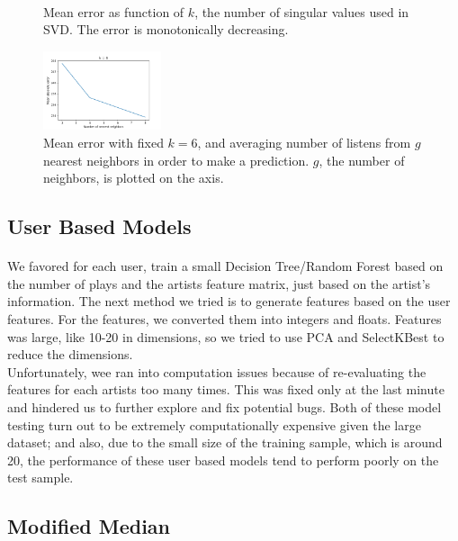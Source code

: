 \documentclass[11pt]{article}
\begin{document}
\begin{figure}[]
\begin{subfigure}[!t]{0.31\textwidth}
    \end{subfigure}\\
        \caption{Mean error as function of $k$, the number of singular values used in SVD. The error is monotonically decreasing.}
            \label{SVD_k}
\end{figure}


\begin{figure}[] 
\centering
        \includegraphics[width=0.31\textwidth]{Plots/SVD_group_8.png}
        \caption{Mean error with fixed $k=6$, and averaging number of listens from $g$ nearest neighbors in order to make a prediction. $g$, the number of neighbors, is plotted on the axis.}
            \label{SVD_g}
\end{figure}


\subsection{User Based Models}
\paragraph{}
We favored for each user, train a small Decision Tree/Random Forest based on the number of plays and the artists feature matrix, just based on the artist's information. The next method we tried is to generate features based on the user features. For the features, we converted them into integers and floats. Features was large, like 10-20 in dimensions, so we tried to use PCA and SelectKBest to reduce the dimensions.\\

Unfortunately, wee ran into computation issues because of re-evaluating the features for each artists too many times. This was fixed only at the last minute and hindered us to further explore and fix potential bugs. Both of these model testing turn out to be extremely computationally expensive given the large dataset; and also, due to the small size of the training sample, which is around 20, the performance of these user based models tend to perform poorly on the test sample.

\subsection{Modified Median}
\end{document}
